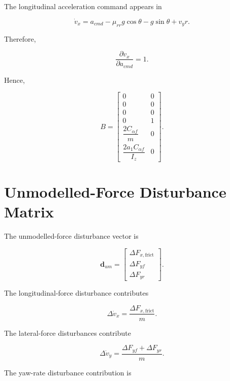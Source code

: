 \documentclass[12pt,a4paper]{article}
\begin{document}
The longitudinal acceleration command appears in

\begin{equation}
\dot v_x
=
a_{cmd}
-\mu_{rr}g\cos\theta
-g\sin\theta
+v_yr.
\end{equation}

Therefore,

\begin{equation}
\frac{\partial\dot v_x}{\partial a_{cmd}}
=
1.
\end{equation}

Hence,

\begin{equation}
\boxed{
B
=
\begin{bmatrix}
0&0\\
0&0\\
0&0\\
0&1\\
\dfrac{2C_{\alpha f}}{m}&0\\
\dfrac{2a_1C_{\alpha f}}{I_z}&0
\end{bmatrix}
}.
\end{equation}

\section{Unmodelled-Force Disturbance Matrix}

The unmodelled-force disturbance vector is

\begin{equation}
\boxed{
\bm{d}_{um}
=
\begin{bmatrix}
\Delta F_{x,\mathrm{frict}}\\
\Delta F_{yf}\\
\Delta F_{yr}
\end{bmatrix}
}.
\end{equation}

The longitudinal-force disturbance contributes

\begin{equation}
\Delta\dot v_x
=
\frac{\Delta F_{x,\mathrm{frict}}}{m}.
\end{equation}

The lateral-force disturbances contribute

\begin{equation}
\Delta\dot v_y
=
\frac{
\Delta F_{yf}
+
\Delta F_{yr}
}{m}.
\end{equation}

The yaw-rate disturbance contribution is
\end{document}
